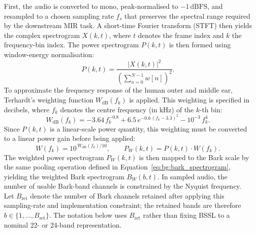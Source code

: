 First, the audio is converted to mono, peak-normalised to $-1\,\mathrm{dBFS}$, and resampled to a chosen sampling rate $f_s$ that preserves the spectral range required by the downstream MIR task. A short-time Fourier transform (STFT) then yields the complex spectrogram $X(k,t)$, where $t$ denotes the frame index and $k$ the frequency-bin index. The power spectrogram $P(k,t)$ is then formed using window-energy normalisation:
\begin{equation}
P(k,t)=\frac{|X(k,t)|^2}{(\sum_{n=0}^{N-1} w[n])^2}.
\end{equation}
To approximate the frequency response of the human outer and middle ear, Terhardt's weighting function $W_{\mathrm{dB}}(f_k)$ \cite{terhardt1979outerear} is applied. This weighting is specified in decibels, where $f_k$ denotes the centre frequency (in $\mathrm{kHz}$) of the $k$-th bin:
\begin{equation}
W_{\mathrm{dB}}(f_k) = -3.64\,f_k^{-0.8} + 6.5\,e^{-0.6\,(f_k-3.3)^2} - 10^{-3}\,f_k^{4}.
\end{equation}
Since $P(k,t)$ is a linear-scale power quantity, this weighting must be converted to a linear power gain before being applied:
\begin{equation}
W(f_k)=10^{\,W_{\mathrm{dB}}(f_k)/10},
\qquad
P_W(k,t)=P(k,t) \cdot W(f_k).
\end{equation}
The weighted power spectrogram $P_W(k,t)$ is then mapped to the Bark scale by the same pooling operation defined in Equation~\eqref{eq:bg:bark_spectrogram}, yielding the weighted Bark spectrogram $B_W(b,t)$. In sampled audio, the number of usable Bark-band channels is constrained by the Nyquist frequency. Let $B_{\mathrm{ret}}$ denote the number of Bark channels retained after applying this sampling-rate and implementation constraint; the retained bands are therefore $b \in \{1,\ldots,B_{\mathrm{ret}}\}$. The notation below uses $B_{\mathrm{ret}}$ rather than fixing BSSL to a nominal 22- or 24-band representation.

